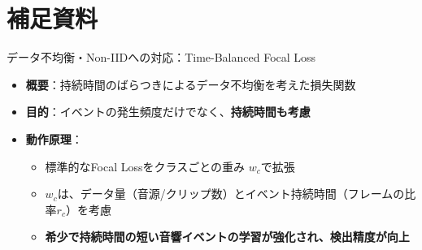 \documentclass[unicode,12pt,aspectratio=169,dvipdfmx]{beamer}
\begin{document}
\section{補足資料}

\begin{frame}{データ不均衡・Non-IIDへの対応：Time-Balanced Focal Loss \cite{TBFL}}
\begin{itemize}
    \item \textbf{概要}：持続時間のばらつきによるデータ不均衡を考えた損失関数
    \item \textbf{目的}：イベントの発生頻度だけでなく、\textbf{持続時間も考慮}
    \item \textbf{動作原理}：
    \begin{itemize}
        \item 標準的なFocal Lossをクラスごとの重み $w_c$で拡張
        \item $w_c$は、データ量（音源/クリップ数）とイベント持続時間（フレームの比率$r_c$）を考慮
        \item \textbf{希少で持続時間の短い音響イベントの学習が強化され、検出精度が向上}
    \end{itemize}
\end{itemize}
\end{frame}
\end{document}
